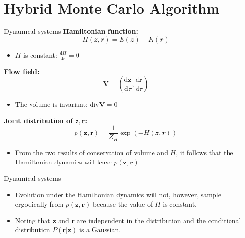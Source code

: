 \documentclass{bredelebeamer}
\begin{document}
\section{Hybrid Monte Carlo Algorithm}
\begin{frame}{Dynamical systems}
  \textbf{Hamiltonian function:}
  \begin{equation}
    H(\mathbfit{z},\mathbfit{r}) = E(\mathbfit{z}) + K(\mathbfit{r})
  \end{equation}
  \begin{itemize}
    \item $H$ is constant:
    $\frac{\mathrm{d}H}{\mathrm{d}r} = 0$
    \\[1.0\baselineskip]
  \end{itemize}

  \textbf{Flow field:}
  \begin{equation}
    \mathbf{V} = \left(
      \frac{\mathrm{d}\mathbf{z}}{\mathrm{d}\tau},
      \frac{\mathrm{d}\mathbf{r}}{\mathrm{d}\tau}
    \right)
  \end{equation}
  \begin{itemize}
    \item The volume is invariant:
    $\textrm{div} \mathbf{V} = 0$
    \\[1.0\baselineskip]
  \end{itemize}

  \textbf{Joint distribution of $\mathbf{z}, \mathbf{r}$:}
  \begin{equation}
    p(\mathbf{z}, \mathbf{r}) =
    \frac{1}{Z_H} \exp{(-H(\mathbfit{z},\mathbfit{r}))}
  \end{equation}
  \begin{itemize}
    \item From the two results of conservation of volume and $H$,
    it follows that the Hamiltonian dynamics will leave
    $p(\mathbf{z}, \mathbf{r})$ .
  \end{itemize}
\end{frame}

\begin{frame}{Dynamical systems}
  \begin{itemize}
    \item Evolution under the Hamiltonian dynamics will not, however,
    sample ergodically from $p(\mathbf{z}, \mathbf{r})$ because
    the value of $H$ is constant.
    \item Noting that $\mathbf{z}$ and $\mathbf{r}$ are independent
    in the distribution and the conditional distribution
    $P(\mathbf{r} | \mathbf{z})$ is a Gaussian.
  \end{itemize}


\end{frame}

\end{document}
